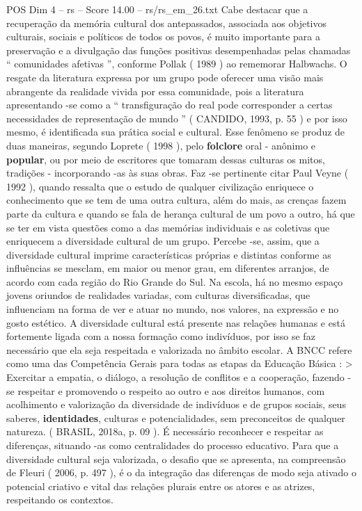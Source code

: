\begin{textsample}{POS Dim 4 – rs – Score 14.00 – rs/rs\_em\_26.txt}
Cabe destacar que a recuperação da memória cultural dos antepassados, associada aos objetivos culturais, sociais e políticos de todos os povos, é muito importante para a preservação e a divulgação das funções positivas desempenhadas pelas chamadas “ comunidades afetivas ”, conforme Pollak ( 1989 ) ao rememorar Halbwachs.
O resgate da literatura expressa por um grupo pode oferecer uma visão mais abrangente da realidade vivida por essa comunidade, pois a literatura apresentando -se como a “ transfiguração do real pode corresponder a certas necessidades de representação de mundo ” ( CANDIDO, 1993, p. 55 ) e por isso mesmo, é identificada sua prática social e cultural.
Esse fenômeno se produz de duas maneiras, segundo Loprete ( 1998 ), pelo \textbf{folclore} oral - anônimo e \textbf{popular}, ou por meio de escritores que tomaram dessas culturas os mitos, tradições - incorporando -as às suas obras.
Faz -se pertinente citar Paul Veyne ( 1992 ), quando ressalta que o estudo de qualquer civilização enriquece o conhecimento que se tem de uma outra cultura, além do mais, as crenças fazem parte da cultura e quando se fala de herança cultural de um povo a outro, há que se ter em vista questões como a das memórias individuais e as coletivas que enriquecem a diversidade cultural de um grupo.
Percebe -se, assim, que a diversidade cultural imprime características próprias e distintas conforme as influências se mesclam, em maior ou menor grau, em diferentes arranjos, de acordo com cada região do Rio Grande do Sul.
Na escola, há no mesmo espaço jovens oriundos de realidades variadas, com culturas diversificadas, que influenciam na forma de ver e atuar no mundo, nos valores, na expressão e no gosto estético.
A diversidade cultural está presente nas relações humanas e está fortemente ligada com a nossa formação como indivíduos, por isso se faz necessário que ela seja respeitada e valorizada no âmbito escolar.
A BNCC refere como uma das Competência Gerais para todas as etapas da Educação Básica : > Exercitar a empatia, o diálogo, a resolução de conflitos e a cooperação, fazendo -se respeitar e promovendo o respeito ao outro e aos direitos humanos, com acolhimento e valorização da diversidade de indivíduos e de grupos sociais, seus saberes, \textbf{identidades}, culturas e potencialidades, sem preconceitos de qualquer natureza. ( BRASIL, 2018a, p. 09 ).
É necessário reconhecer e respeitar as diferenças, situando -as como centralidades do processo educativo.
Para que a diversidade cultural seja valorizada, o desafio que se apresenta, na compreensão de Fleuri ( 2006, p. 497 ), é o da integração das diferenças de modo seja ativado o potencial criativo e vital das relações plurais entre os atores e as atrizes, respeitando os contextos.

\end{textsample}
